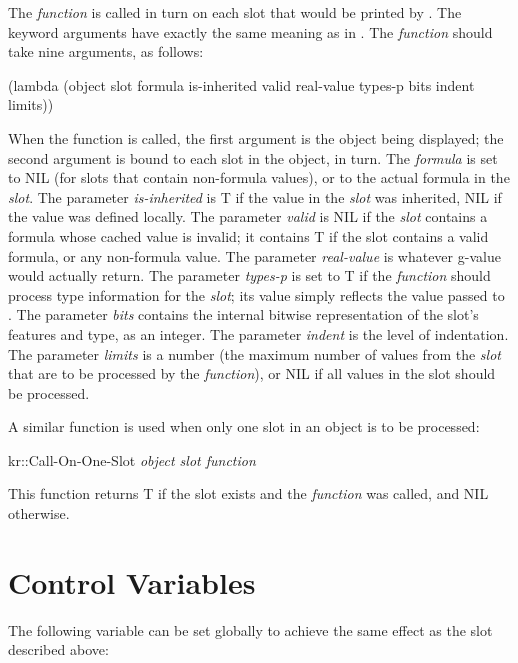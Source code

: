 The {\it function} is called in turn on each slot that would be printed
by .  The keyword arguments have exactly the same meaning as in
.  The {\it function} should take nine arguments, as follows:
\begin{programexample}
(lambda (object slot formula is-inherited valid real-value types-p bits indent limits))
\end{programexample}
When the function is called, the first argument is the object being
displayed; the second argument is bound to each slot in the object, in
turn.  The {\it formula} is set to NIL (for slots that contain
non-formula values), or to the actual formula in the {\it slot}.  The
parameter {\it is-inherited} is T if the value in the {\it slot} was
inherited, NIL if the value was defined locally.  The parameter
{\it valid} is NIL if the {\it slot} contains a formula whose cached value
is invalid; it contains T if the slot contains a valid formula, or any
non-formula value.  The parameter {\it real-value} is whatever g-value
would actually return.  The parameter {\it types-p} is set to T if the
{\it function} should process type information for the {\it slot}; its
value simply reflects the value passed to .
The parameter {\it bits} contains the internal bitwise representation of
the slot's features and type, as an integer.  The parameter {\it indent}
is the level of indentation.  The parameter
{\it limits} is a number (the maximum number of values from the {\it slot}
that are to be processed by the {\it function}), or NIL if all values in
the slot should be processed.

\vspace{1 line}
\begin{group}
A similar function is used when only one slot in an object is to be processed:
\begin{example}
kr::Call-On-One-Slot {\it object slot function}  \value{function}
\end{example}

This function returns T if the slot exists and
the {\it function} was called, and NIL otherwise.
\end{group}




\section{Control Variables}
\value{s-top}


The following variable can be set globally to achieve the same effect as
the slot  described above:

